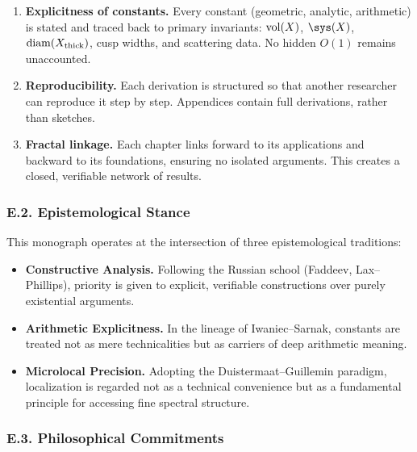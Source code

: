 \begin{enumerate}[label=\arabic*.]
  \item \textbf{Explicitness of constants.}
        Every constant (geometric, analytic, arithmetic) is stated and traced back to
        primary invariants: $\operatorname{vol}(X)$, $\sys(X)$, $\operatorname{diam}(X_{\mathrm{thick}})$,
        cusp widths, and scattering data.
        No hidden $O(1)$ remains unaccounted.

  \item \textbf{Reproducibility.}
        Each derivation is structured so that another researcher can reproduce it step by step.
        Appendices contain full derivations, rather than sketches.

  \item \textbf{Fractal linkage.}
        Each chapter links forward to its applications and backward to its foundations,
        ensuring no isolated arguments. This creates a closed, verifiable network of results.
\end{enumerate}

\subsubsection*{E.2. Epistemological Stance}

This monograph operates at the intersection of three epistemological traditions:

\begin{itemize}
  \item \textbf{Constructive Analysis.}
        Following the Russian school (Faddeev, Lax–Phillips),
        priority is given to explicit, verifiable constructions
        over purely existential arguments.

  \item \textbf{Arithmetic Explicitness.}
        In the lineage of Iwaniec–Sarnak,
        constants are treated not as mere technicalities but as carriers of
        deep arithmetic meaning.

  \item \textbf{Microlocal Precision.}
        Adopting the Duistermaat–Guillemin paradigm,
        localization is regarded not as a technical convenience but as a fundamental
        principle for accessing fine spectral structure.
\end{itemize}

\subsubsection*{E.3. Philosophical Commitments}


